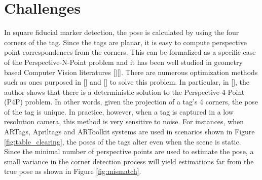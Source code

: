 \section{Challenges}
\label{sec:problem}
In square fiducial marker detection, the pose is calculated by using the four corners of the tag. Since the tags are planar, it is easy to compute perspective point correspondences from the corners. This can be formalized as a specific case of the Perspective-N-Point problem and it has been well studied in geometry based Computer Vision literatures [][]. There are numerous optimization methods such as ones purposed in [] and [] to solve this problem. In particular, in [], the author shows that there is a deterministic solution to the Perspective-4-Point (P4P) problem. In other words, given the projection of a tag's 4 corners, the pose of the tag is unique. In practice, however, when a tag is captured in a low resolution camera, this method is very sensitive to noise. For instances, when ARTags, Apriltags and ARToolkit systems are used in scenarios shown in Figure \ref{fig:table_clearing}, the poses of the tags alter even when the scene is static. Since the minimal number of perspective points are used to estimate the pose, a small variance in the corner detection process will yield estimations far from the true pose as shown in Figure \ref{fig:mismatch}.

